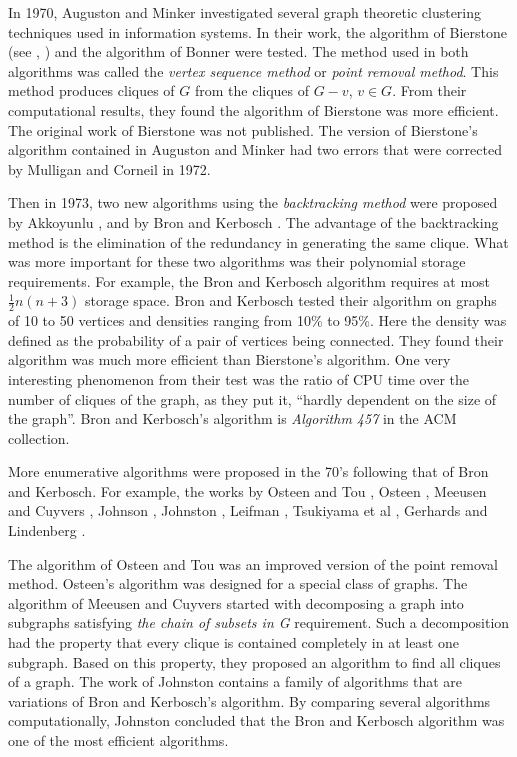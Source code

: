 In 1970, Auguston and Minker \cite{AuMi70} investigated several
graph theoretic clustering techniques used in information systems.
In their work, the algorithm of Bierstone (see \cite{AuMi70},
\cite{MuCo72}) and the algorithm of Bonner \cite{Bon64} were tested.
The method used in both algorithms was called the {\em vertex
sequence method} or {\em point removal method}. This method produces
cliques of $G$ from the cliques of $G-v$, $v \in G$. From their
computational results, they found the algorithm of Bierstone was
more efficient. The original work of Bierstone was not published.
The version of Bierstone's algorithm contained in Auguston and
Minker \cite{AuMi70} had two errors that were corrected by Mulligan
and Corneil \cite{MuCo72} in 1972. 


Then in 1973, two new algorithms using the {\em backtracking method}
were proposed by Akkoyunlu \cite{Akk73}, and by Bron and Kerbosch
\cite{BrKe73}. The advantage of the backtracking method is the
elimination of the redundancy in generating the same clique. What
was more important for these two algorithms was their polynomial
storage requirements. For example, the Bron and Kerbosch algorithm
requires at most $\frac{1}{2}n(n+3)$ storage space. Bron and
Kerbosch tested their algorithm on graphs of 10 to 50 vertices and
densities ranging from 10\% to 95\%. Here the density was defined as
the probability of a pair of vertices being connected. They found
their algorithm was much more efficient than
Bierstone's algorithm. One very interesting phenomenon from their
test was the ratio of CPU time over the number of cliques of the
graph, as they put it, ``hardly dependent on the size of the
graph''. Bron and Kerbosch's algorithm is {\em Algorithm 457}
in the ACM collection.

More enumerative algorithms were proposed in the 70's following that
of Bron and Kerbosch. For example, the works by Osteen and Tou
\cite{OsTo73}, Osteen \cite{Ost74}, Meeusen and Cuyvers
\cite{MeCu75}, Johnson \cite{Joh75}, Johnston \cite{Joh76}, Leifman
\cite{Lei76}, Tsukiyama et al \cite{TsIdAvSh77}, Gerhards and
Lindenberg \cite{GeLi79}.

The algorithm of Osteen and Tou \cite{OsTo73} was an improved
version of the point removal method. Osteen's \cite{Ost74} algorithm
was designed for a special class of graphs. The algorithm of Meeusen
and Cuyvers \cite{MeCu75} started with decomposing a graph into
subgraphs satisfying {\em the chain of subsets in G} requirement.
Such a decomposition had the property that every clique is contained
completely in at least one subgraph. Based on this property, they
proposed an algorithm to find all cliques of a graph. The work of
Johnston \cite{Joh76} contains a family of algorithms that are
variations of Bron and Kerbosch's algorithm. By comparing several
algorithms computationally, Johnston \cite{Joh76} concluded that the
Bron and Kerbosch algorithm was one of the most efficient algorithms.

